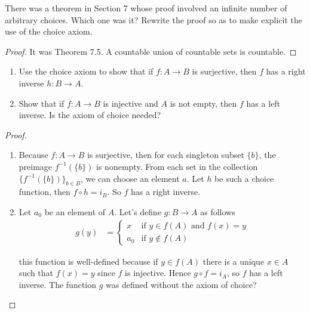 \begin{exercise}\label{chapter1:section9:exercise4}
    There was a theorem in Section 7 whose proof involved an infinite number of arbitrary choices. Which one was it? Rewrite the proof so as to make explicit the use of the choice axiom.
\end{exercise}

\begin{proof}
    It was Theorem 7.5. A countable union of countable sets is countable.
\end{proof}

\begin{exercise}\label{chapter1:section9:exercise5}
    \begin{enumerate}[label={(\alph*)}]
        \item Use the choice axiom to show that if $f: A \to B$ is surjective, then $f$ has a right inverse $h: B\to A$.
        \item Show that if $f: A\to B$ is injective and $A$ is not empty, then $f$ has a left inverse. Is the axiom of choice needed?
    \end{enumerate}
\end{exercise}

\begin{proof}
    \begin{enumerate}[label={(\alph*)}]
        \item Because $f: A\to B$ is surjective, then for each singleton subset $\{ b \}$, the preimage $f^{-1}(\{b\})$ is nonempty. From each set in the collection ${\{ f^{-1}(\{b\}) \}}_{b\in B}$, we can choose an element $a$. Let $h$ be such a choice function, then $f\circ h = i_{B}$. So $f$ has a right inverse.
        \item Let $a_{0}$ be an element of $A$. Let's define $g: B\to A$ as follows
              \begin{align*}
                  g(y) & = \begin{cases}
                               x     & \text{if $y\in f(A)$ and $f(x) = y$} \\
                               a_{0} & \text{if $y\notin f(A)$}
                           \end{cases}
              \end{align*}

              this function is well-defined because if $y\in f(A)$ there is a unique $x\in A$ such that $f(x) = y$ since $f$ is injective. Hence $g\circ f = i_{A}$, so $f$ has a left inverse. The function $g$ was defined without the axiom of choice?
    \end{enumerate}
\end{proof}

